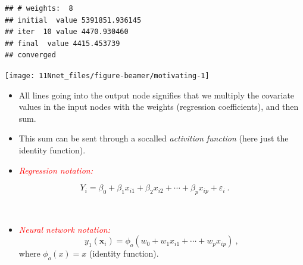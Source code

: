 \documentclass[10pt,ignorenonframetext,]{beamer}
\providecommand{\tightlist}{%
  \setlength{\itemsep}{0pt}\setlength{\parskip}{0pt}}
\begin{document}
\begin{frame}[fragile]

\vspace{-20mm}

\scriptsize

\begin{verbatim}
## # weights:  8
## initial  value 5391851.936145 
## iter  10 value 4470.930460
## final  value 4415.453739 
## converged
\end{verbatim}

\begin{center}\texttt{[image: 11Nnet\_files/figure-beamer/motivating-1]} \end{center}

\normalsize

\begin{itemize}
\tightlist
\item
  All lines going into the output node signifies that we multiply the
  covariate values in the input nodes with the weights (regression
  coefficients), and then sum.
\item
  This sum can be sent through a socalled \emph{activition function}
  (here just the identity function).
\end{itemize}

\end{frame}

\begin{frame}

\begin{itemize}
\tightlist
\item
  \emph{\textcolor{red}{Regression notation:}}
\end{itemize}

\begin{equation*}
 Y_i=\beta_0 + \beta_1 x_{i1}+\beta_2 x_{i2}+\cdots + \beta_p x_{ip}+\varepsilon_i \ .
\end{equation*}

\(~\)

\begin{itemize}
\tightlist
\item
  \emph{\textcolor{red}{Neural network notation:}} \begin{equation*}
  y_1({\boldsymbol x}_i)=\phi_o(w_0+w_1 x_{i1}+\cdots + w_p x_{ip}) \ ,
  \end{equation*} where \(\phi_o(x)=x\) (identity function).
\end{itemize}

\end{frame}
\end{document}
